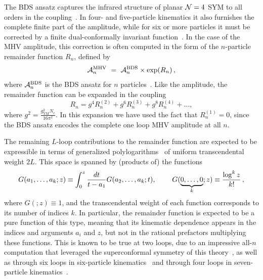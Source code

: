 \documentclass[11pt]{article}
\begin{document}
The BDS ansatz captures the infrared structure of planar ${\cal N} = 4$ SYM to all orders in the coupling~\cite{Bern:2005iz}. In four- and five-particle kinematics it also furnishes the complete finite part of the amplitude, while for six or more particles it must be corrected by a finite dual-conformally invariant function~\cite{Drummond:2007au,Bern:2008ap,Drummond:2008aq}. In the case of the MHV amplitude, this correction is often computed in the form of the $n$-particle remainder function $R_n$, defined by
\begin{equation} \label{eq:remainder_function}
\mathcal{A}_n^{\rm MHV}\ =\ \mathcal{A}_n^{\rm BDS}  \times \exp(R_n)\,,
\end{equation}
where $\mathcal{A}_n^{\rm BDS}$ is the BDS ansatz for $n$ particles~\cite{Bern:2005iz}. Like the amplitude, the remainder function can be expanded in the coupling
\begin{equation}
R_n = g^4 R_n^{(2)} + g^6 R_n^{(3)} + g^8 R_n^{(4)} + \dots ,
\end{equation}
where $g^2 = \frac{g_{\text{YM}}^2 N_c}{16 \pi^2}$. In this expansion we have used the fact that $R_n^{(1)} = 0$, since the BDS ansatz encodes the complete one loop MHV amplitude at all $n$. 

The remaining $L$-loop contributions to the remainder function are expected to be expressible in terms of generalized polylogarithms~\cite{Chen,FBThesis,Gonch} of uniform transcendental weight $2L$. This space is spanned by (products of) the functions
\begin{equation} \label{eq:multiple_polylogs}
G(a_1, \dots, a_k; z) \equiv \int_0^z \frac{dt}{t-a_1} G(a_2,\dots,a_k; t), \hspace{0.8cm} G(\underbrace{0,\dots,0}_k;z) \equiv \frac{\log^k z}{k!}\, ,
\end{equation}
where $G(;z) \equiv 1$, and the transcendental weight of each function corresponds to its number of indices $k$. In particular, the remainder function is expected to be a pure function of this type, meaning that its kinematic dependence appears in the indices and arguments $a_i$ and $z$, but not in the rational prefactors multiplying these functions. This is known to be true at two loops, due to an impressive all-$n$ computation that leveraged the superconformal symmetry of this theory~\cite{CaronHuot:2011ky}, as well as through six loops in six-particle kinematics~\cite{Dixon:2013eka,Dixon:2014voa,Caron-Huot:2016owq,cosmic_galois_paper} and through four loops in seven-particle kinematics~\cite{Drummond:2014ffa,Dixon:2016nkn}. 
\end{document}
